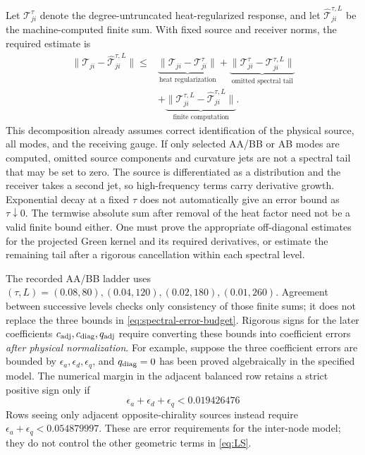 \documentclass[a4paper,11pt]{article}
\numberwithin{equation}{section}
\theoremstyle{definition}
\begin{document}
Let $\mathcal T_{ji}^{\tau}$ denote the degree-untruncated heat-regularized response,
and let $\widehat{\mathcal T}_{ji}^{\tau,L}$ be the machine-computed finite sum.
With fixed source and receiver norms, the required estimate is
\begin{equation}\label{eq:spectral-error-budget}
\begin{split}
\|\mathcal T_{ji}-\widehat{\mathcal T}_{ji}^{\tau,L}\|
\le{}&\underbrace{\|\mathcal T_{ji}-\mathcal T_{ji}^{\tau}\|}_{\text{heat regularization}}
+\underbrace{\|\mathcal T_{ji}^{\tau}-\mathcal T_{ji}^{\tau,L}\|}_{\text{omitted spectral tail}}\\
&+\underbrace{\|\mathcal T_{ji}^{\tau,L}-
\widehat{\mathcal T}_{ji}^{\tau,L}\|}_{\text{finite computation}}.
\end{split}
\end{equation}
This decomposition already assumes correct identification of the physical source, all modes, and the receiving gauge.
If only selected AA/BB or AB modes are computed, omitted source components and curvature jets are not a spectral tail that may be set to zero.
The source is differentiated as a distribution and the receiver takes a second jet, so high-frequency terms carry derivative growth.
Exponential decay at a fixed $\tau$ does not automatically give an error bound as $\tau\downarrow0$.
The termwise absolute sum after removal of the heat factor need not be a valid finite bound either.
One must prove the appropriate off-diagonal estimates for the projected Green kernel and its required derivatives,
or estimate the remaining tail after a rigorous cancellation within each spectral level.

The recorded AA/BB ladder uses
$(\tau,L)=(0.08,80),(0.04,120),(0.02,180),(0.01,260)$.
Agreement between successive levels checks only consistency of those finite sums; it does not replace
the three bounds in \eqref{eq:spectral-error-budget}.
Rigorous signs for the later coefficients $c_{\rm adj},c_{\rm diag},q_{\rm adj}$
require converting these bounds into coefficient errors \emph{after physical normalization}.
For example, suppose the three coefficient errors are bounded by
$\epsilon_a,\epsilon_d,\epsilon_q$, and $q_{\rm diag}=0$ has been proved algebraically in the specified model.
The numerical margin in the adjacent balanced row retains a strict positive sign only if
\[
\epsilon_a+\epsilon_d+\epsilon_q<0.019426476
\]
Rows seeing only adjacent opposite-chirality sources instead require
$\epsilon_a+\epsilon_q<0.054879997$.
These are error requirements for the inter-node model; they do not control the other geometric terms in \eqref{eq:LS}.
\end{document}
